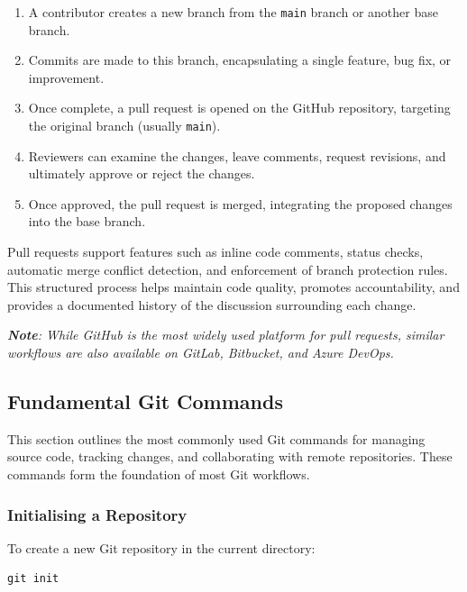 \documentclass{article}
\newcommand{\codecmd}[1]{\textcolor[rgb]{0,0.5,0}{\texttt{#1}}}
\begin{document}
\begin{enumerate}
    \item A contributor creates a new branch from the \codecmd{main} branch or another base branch.
    \item Commits are made to this branch, encapsulating a single feature, bug fix, or improvement.
    \item Once complete, a pull request is opened on the GitHub repository, targeting the original branch (usually \codecmd{main}).
    \item Reviewers can examine the changes, leave comments, request revisions, and ultimately approve or reject the changes.
    \item Once approved, the pull request is merged, integrating the proposed changes into the base branch.
\end{enumerate}

Pull requests support features such as inline code comments, status checks, automatic merge conflict detection, and enforcement of branch protection rules. This structured process helps maintain code quality, promotes accountability, and provides a documented history of the discussion surrounding each change.

\medskip
\textit{\textbf{Note}: While GitHub is the most widely used platform for pull requests, similar workflows are also available on GitLab, Bitbucket, and Azure DevOps.}



\subsection{Fundamental Git Commands}

This section outlines the most commonly used Git commands for managing source code, tracking changes, and collaborating with remote repositories. These commands form the foundation of most Git workflows.

\subsubsection{Initialising a Repository}

To create a new Git repository in the current directory:

\begin{tcolorbox}[colback=mintgreen, colframe=green!40!black, boxrule=0.5pt, sharp corners]
\begin{verbatim}
git init
\end{verbatim}
\end{tcolorbox}
\end{document}
